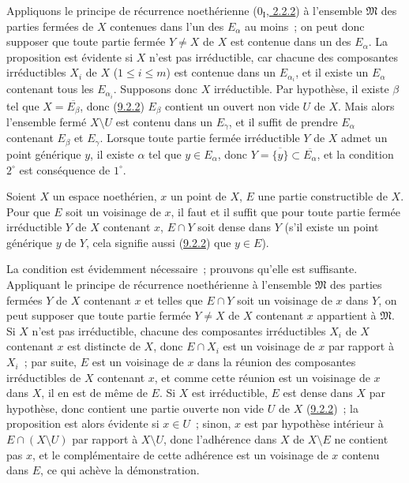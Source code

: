 Appliquons le principe de récurrence noethérienne
(\hyperref[0.2.2.2-fr]{$0_{\mathrm I}$, 2.2.2}) à l'ensemble
$\mathfrak{M}$ des parties fermées de $X$ contenues dans l'un des $E_\alpha$
au moins~; on peut donc supposer que toute partie fermée $Y\ne X$ de $X$ est
contenue dans un des $E_\alpha$. La proposition est évidente si $X$ n'est pas
irréductible, car chacune des composantes irréductibles $X_i$ de $X$
($1\leq i\leq m$) est contenue dans un $E_{\alpha_i}$, et il existe un
$E_\alpha$ contenant tous les $E_{\alpha_i}$. Supposons donc $X$
irréductible. Par hypothèse, il existe $\beta$ tel que
$X=\overline{E_\beta}$, donc (\hyperref[0.9.2.2-fr]{9.2.2}) $E_\beta$
contient un ouvert non vide $U$ de $X$. Mais alors l'ensemble fermé
$X\setminus U$ est contenu dans un $E_\gamma$, et il suffit de prendre
$E_\alpha$ contenant $E_\beta$ et $E_\gamma$. Lorsque toute partie fermée
irréductible $Y$ de $X$
admet un point générique $y$, il existe $\alpha$ tel que $y\in E_\alpha$,
donc $Y=\overline{\{y\}}\subset\overline{E_\alpha}$, et la condition
$2^\circ$ est conséquence de $1^\circ$.

\begin{proposition}[9.2.5]
\label{0.9.2.5-fr}
Soient $X$ un espace noethérien, $x$ un point de $X$, $E$ une partie
constructible de $X$. Pour que $E$ soit un voisinage de $x$, il faut et il
suffit que pour toute partie fermée irréductible $Y$ de $X$ contenant $x$,
$E\cap Y$ soit dense dans $Y$ (s'il existe un point générique $y$ de $Y$,
cela signifie aussi (\hyperref[0.9.2.2-fr]{9.2.2}) que $y\in E$).
\end{proposition}

La condition est évidemment nécessaire~; prouvons qu'elle est suffisante.
Appliquant le principe de récurrence noethérienne à l'ensemble $\mathfrak{M}$
des parties fermées $Y$ de $X$ contenant $x$ et telles que $E\cap Y$ soit un
voisinage de $x$ dans $Y$, on peut supposer que toute partie fermée $Y\ne X$
de $X$ contenant $x$ appartient à $\mathfrak{M}$. Si $X$ n'est pas
irréductible, chacune des composantes irréductibles $X_i$ de $X$ contenant
$x$ est distincte de $X$, donc $E\cap X_i$ est un voisinage de $x$ par
rapport à $X_i$~; par suite, $E$ est un voisinage de $x$ dans la réunion des
composantes irréductibles de $X$ contenant $x$, et comme cette réunion est un
voisinage de $x$ dans $X$, il en est de même de $E$. Si $X$ est
irréductible, $E$ est dense dans $X$ par hypothèse, donc contient une partie
ouverte non vide $U$ de $X$ (\hyperref[0.9.2.2-fr]{9.2.2})~; la proposition
est alors évidente si $x\in U$~; sinon, $x$ est par hypothèse intérieur à
$E\cap(X\setminus U)$ par rapport à $X\setminus U$, donc l'adhérence dans
$X$ de $X\setminus E$ ne contient pas $x$, et le complémentaire de cette
adhérence est un voisinage de $x$ contenu dans $E$, ce qui achève la
démonstration.

